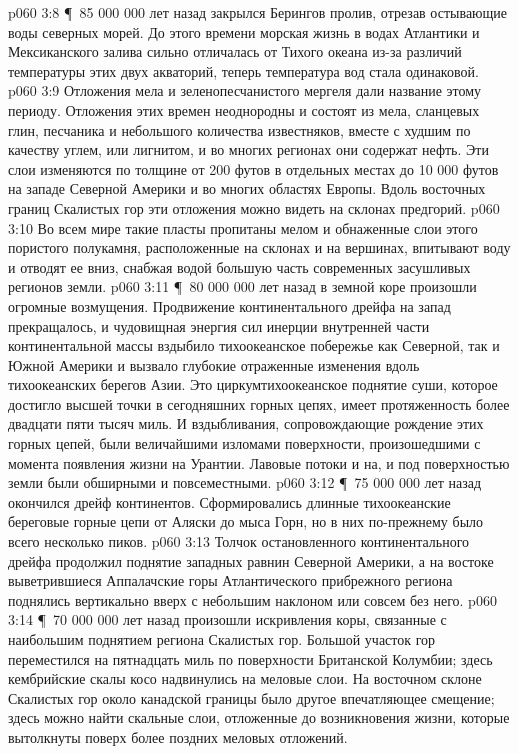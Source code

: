 \vs p060 3:8 \P\ 85 000 000 лет назад закрылся Берингов пролив, отрезав остывающие воды северных морей. До этого времени морская жизнь в водах Атлантики и Мексиканского залива сильно отличалась от Тихого океана из\hyp{}за различий температуры этих двух акваторий, теперь температура вод стала одинаковой.
\vs p060 3:9 Отложения мела и зеленопесчанистого мергеля дали название этому периоду. Отложения этих времен неоднородны и состоят из мела, сланцевых глин, песчаника и небольшого количества известняков, вместе с худшим по качеству углем, или лигнитом, и во многих регионах они содержат нефть. Эти слои изменяются по толщине от 200 футов в отдельных местах до 10 000 футов на западе Северной Америки и во многих областях Европы. Вдоль восточных границ Скалистых гор эти отложения можно видеть на склонах предгорий.
\vs p060 3:10 Во всем мире такие пласты пропитаны мелом и обнаженные слои этого пористого полукамня, расположенные на склонах и на вершинах, впитывают воду и отводят ее вниз, снабжая водой большую часть современных засушливых регионов земли.
\vs p060 3:11 \P\ 80 000 000 лет назад в земной коре произошли огромные возмущения. Продвижение континентального дрейфа на запад прекращалось, и чудовищная энергия сил инерции внутренней части континентальной массы вздыбило тихоокеанское побережье как Северной, так и Южной Америки и вызвало глубокие отраженные изменения вдоль тихоокеанских берегов Азии. Это циркумтихоокеанское поднятие суши, которое достигло высшей точки в сегодняшних горных цепях, имеет протяженность более двадцати пяти тысяч миль. И вздыбливания, сопровождающие рождение этих горных цепей, были величайшими изломами поверхности, произошедшими с момента появления жизни на Урантии. Лавовые потоки и на, и под поверхностью земли были обширными и повсеместными.
\vs p060 3:12 \P\ 75 000 000 лет назад окончился дрейф континентов. Сформировались длинные тихоокеанские береговые горные цепи от Аляски до мыса Горн, но в них по\hyp{}прежнему было всего несколько пиков.
\vs p060 3:13 Толчок остановленного континентального дрейфа продолжил поднятие западных равнин Северной Америки, а на востоке выветрившиеся Аппалачские горы Атлантического прибрежного региона поднялись вертикально вверх с небольшим наклоном или совсем без него.
\vs p060 3:14 \P\ 70 000 000 лет назад произошли искривления коры, связанные с наибольшим поднятием региона Скалистых гор. Большой участок гор переместился на пятнадцать миль по поверхности Британской Колумбии; здесь кембрийские скалы косо надвинулись на меловые слои. На восточном склоне Скалистых гор около канадской границы было другое впечатляющее смещение; здесь можно найти скальные слои, отложенные до возникновения жизни, которые вытолкнуты поверх более поздних меловых отложений.
